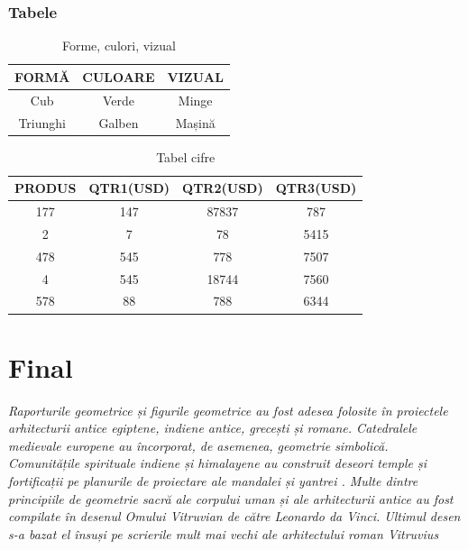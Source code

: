 \documentclass{article}
\begin{document}
\subsubsection{Tabele}
\hfill\break


\begin{table}[h!]
\centering
\begin{tabular}{||c c c ||} 
 \hline
 \textbf{FORMĂ}  & \textbf{CULOARE} & \textbf{VIZUAL} \\ 
\hline\hline
 Cub & Verde & Minge \\ 
\hline
 Triunghi & Galben & Mașină \\
\hline
\end{tabular}
\caption{Forme, culori, vizual}
\label{Tabel:1}
\end{table}
\begin{table}[h!]
\centering
\begin{tabular}{||c|| c|| c|| c||} 
 \hline
 PRODUS & QTR1(USD) & QTR2(USD) & QTR3(USD) \\ [0.5ex] 
 \hline\hline
 177 & 147 & 87837 & 787 \\ 
 \hline
 2 & 7 & 78 & 5415 \\
 \hline
 478 & 545 & 778 & 7507 \\
 \hline
 4 & 545 & 18744 & 7560 \\
 \hline
 578 & 88 & 788 & 6344 \\ [1ex] 
 \hline
\end{tabular}
\caption{Tabel cifre}
\label{table:2}
\end{table}

\clearpage{}


\section{Final}

\hfill\break
\hfill\break
\hfill\break
\hfill\break

\textit{Raporturile geometrice și figurile geometrice au fost adesea folosite în proiectele arhitecturii antice egiptene, indiene antice, grecești și romane. Catedralele medievale europene au încorporat, de asemenea, geometrie simbolică. Comunitățile spirituale indiene și himalayene au construit deseori temple și fortificații pe planurile de proiectare ale mandalei și yantrei .
Multe dintre principiile de geometrie sacră ale corpului uman și ale arhitecturii antice au fost compilate în desenul Omului Vitruvian de către Leonardo da Vinci. Ultimul desen s-a bazat el însuși pe scrierile mult mai vechi ale arhitectului roman Vitruvius}
\end{document}
